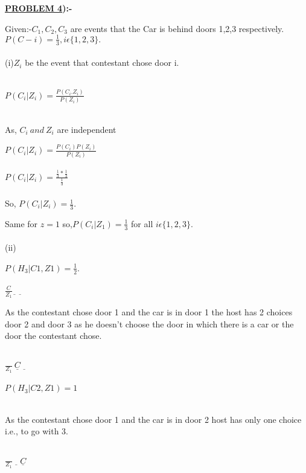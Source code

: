 \documentclass[a4paper]{article}
\begin{document}
\begin{flushleft}
\Large{\textbf{\underline{PROBLEM 4}):-}}
\Large{
Given:-$C_1,C_2,C_3$ are events that the Car is behind doors 1,2,3 respectively.\\
$P(C-i)=\frac{1}{3} , i\epsilon\{1,2,3\}.$\\ \ \\
(i)$Z_i$ be the event that contestant chose door i.\\ \ \\
\begin{center}
$P(C_i|Z_i) = \frac{P(C_i.Z_i)}{P(Z_i)}$ \\ \ \\
\end{center}
As, $C_i\ and\ Z_i$ are independent 
\begin{center}
$P(C_i|Z_i) = \frac{P(C_i)P(Z_i)}{P(Z_i)}$\\ \ \\
$P(C_i|Z_i) = \frac{{\frac{1}{3}}*{\frac{1}{3}}}{\frac{1}{3}}$\\ \ \\
So, $P(C_i|Z_i)=\frac{1}{3}$.
\end{center}
Same for $z = 1$ so,$P(C_i|Z_1)=\frac{1}{3}$ for all $i\epsilon\{1,2,3\}$.\\ \ \\ 
(ii)\\ 
\begin{center}
$P(H_3|C1,Z1)= \frac{1}{2}$.\\ \ \\
$\frac{C}{Z_1} \underline{\ \ }\ \underline{\ \ }$
\end{center}
As the contestant chose door 1 and the car is in door 1 the host has 2 choices {door 2 and door 3} as he doesn't choose the door in which there is a car or the door the contestant chose. \\ \ \\
\begin{center}
$\frac{\ }{Z_1}\ \underline{C}\ \underline{\ \ }$\\ \ \\
$P(H_3|C2,Z1)= 1$\\ \ \\
\end{center}
As the contestant chose door 1 and the car is in door 2 host has only one choice i.e., to go with 3.\\ \ \\
\begin{center}
$\frac{\ }{Z_1}\ \underline{\ \ }\ \underline{C}$\\ \ \\

\end{center}}
\end{flushleft}
\end{document}
